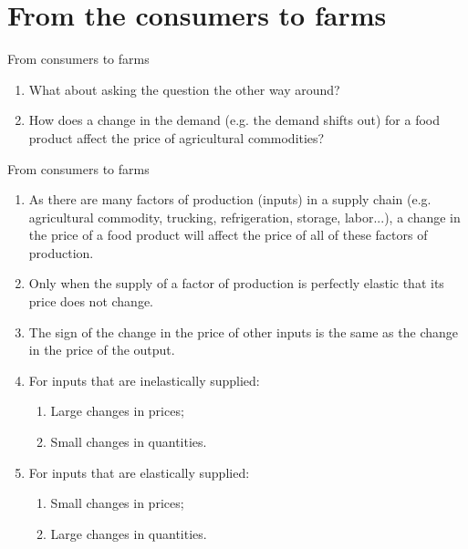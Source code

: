 \documentclass[table,xcolor=pdftex,dvipsnames, handout]{beamer}\usepackage[]{graphicx}\usepackage[]{color}
\begin{document}
\section{From the consumers to farms}

\begin{frame}{From consumers to farms}
\begin{enumerate}[label=\textbullet]
  \item What about asking the question the other way around?
  \item How does a change in the demand (e.g. the demand shifts out) for a food product affect the price of agricultural commodities?
\end{enumerate}
\end{frame}


\begin{frame}{From consumers to farms}
\begin{enumerate}[label=\textbullet]
  \item As there are many factors of production (inputs) in a supply chain (e.g. agricultural commodity, trucking, refrigeration, storage, labor...), a change in the price of a food product will affect the price of all of these factors of production.
  \item Only when the supply of a factor of production is perfectly elastic that its price does not change.
  \item The sign of the change in the price of other inputs is the same as the change in the price of the output.
  \item For inputs that are inelastically supplied:
        \begin{enumerate}[label=-]
          \item Large changes in prices;
          \item Small changes in quantities.
        \end{enumerate}
  \item For inputs that are elastically supplied:
        \begin{enumerate}[label=-]
          \item Small changes in prices;
          \item Large changes in quantities.
        \end{enumerate}
\end{enumerate}
\end{frame}
\end{document}
